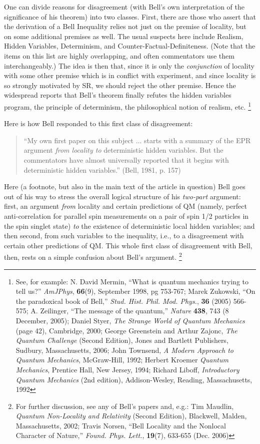 \documentclass[12pt]{article}
\begin{document}
One can divide reasons for disagreement (with Bell's own interpretation
of the significance of his theorem) into two classes.  First, there are
those who assert that the derivation of a Bell Inequality relies not
just on the premise of locality, but on some additional premises
as well.  The usual suspects here include Realism, Hidden Variables,
Determinism, and Counter-Factual-Definiteness.  (Note that the items
on this list are highly overlapping, and often commentators use them
interchangeably.)  The idea is then that, since it is only the
\emph{conjunction} of locality with some other premise which is in conflict
with experiment, and since locality is so strongly motivated by SR, we
should reject the other premise.  Hence the widespread reports that
Bell's theorem finally refutes the hidden variables program, the
principle of determinism, the philosophical notion of realism, etc.%
\footnote{See, for example:  N. David Mermin, ``What is quantum
  mechanics trying to tell us?'' \emph{AmJPhys}, {\bf{66}}(9),
  September 1998, pg 753-767; Marek Zukowski, ``On the paradoxical
  book of Bell,'' \emph{Stud. Hist. Phil. Mod. Phys.}, {\bf{36}}
  (2005) 566-575; A. Zeilinger, ``The message of the quantum,''
  \emph{Nature} {\bf{438}}, 743 (8 December, 2005); Daniel Styer,
  \emph{The Strange World of Quantum Mechanics} (page 42), Cambridge,
  2000; George Greenstein and Arthur Zajonc, \emph{The Quantum
    Challenge} (Second Edition), Jones and Bartlett Publishers,
  Sudbury, Massachusetts, 2006; John Townsend, \emph{A Modern Approach
  to Quantum Mechanics}, McGraw-Hill, 1992; Herbert Kroemer
\emph{Quantum Mechanics}, Prentice Hall, New Jersey, 1994; Richard
Liboff, \emph{Introductory Quantum Mechanics} (2nd edition),
Addison-Wesley, Reading, Massachusetts, 1992}

Here is how Bell responded to this first class of disagreement:
\begin{quote}
``My own first paper on this subject ... starts with a
summary of the EPR argument \emph{from locality to} deterministic
hidden variables.  But the commentators have almost universally
reported that it begins with deterministic hidden variables.''
(Bell, 1981, p. 157)
\end{quote}
Here
(a footnote, but also in the main text of the article in question)
Bell goes out of his way to stress the overall logical structure of
his \emph{two-part} argument:  first, an argument \emph{from} locality and
certain predictions of QM (namely, perfect anti-correlation for
parallel spin measurements on a pair of spin 1/2 particles in the spin
singlet state) \emph{to} the existence of deterministic local hidden
variables; and then second, from such variables to the inequality,
i.e., to a disagreement with certain other predictions of QM.  This
whole first class of disagreement with Bell, then, rests on a simple
confusion about Bell's argument.%
\footnote{For further discussion, see any of Bell's papers and, e.g.:
  Tim Maudlin, \emph{Quantum Non-Locality and Relativity} (Second
  Edition), Blackwell, Malden, Massachusetts, 2002;  Travis Norsen,
  ``Bell Locality and the Nonlocal Character of Nature,''
  \emph{Found. Phys. Lett.}, {\bf{19}}(7), 633-655 (Dec. 2006)}
\end{document}
